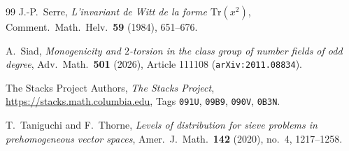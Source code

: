 \begin{thebibliography}{99}
J.-P.~Serre,
\emph{L'invariant de Witt de la forme $\mathrm{Tr}(x^2)$},
Comment.\ Math.\ Helv.\ \textbf{59} (1984), 651--676.

A.~Siad,
\emph{Monogenicity and $2$-torsion in the class group of number fields of odd degree},
Adv.\ Math.\ \textbf{501} (2026), Article 111108 (\texttt{arXiv:2011.08834}).

The Stacks Project Authors,
\emph{The Stacks Project}, \url{https://stacks.math.columbia.edu}, Tags \texttt{091U}, \texttt{09B9}, \texttt{090V}, \texttt{0B3N}.

T.~Taniguchi and F.~Thorne,
\emph{Levels of distribution for sieve problems in prehomogeneous vector spaces},
Amer.\ J.\ Math.\ \textbf{142} (2020), no.~4, 1217--1258.

\end{thebibliography}
